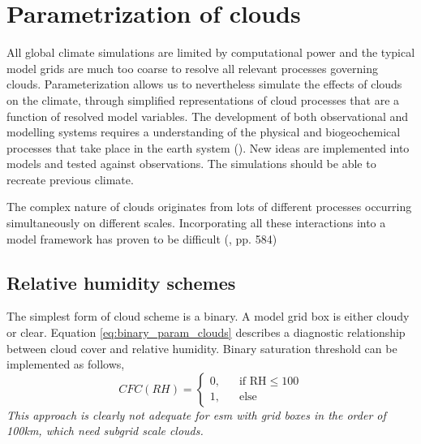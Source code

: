 \section{Parametrization of clouds} \label{sec:param_clouds}
All global climate simulations are limited by computational power and the typical model grids are much too coarse to resolve all relevant processes governing clouds. Parameterization allows us to nevertheless simulate the effects of clouds on the climate, through simplified representations of cloud processes that are a function of resolved model variables. The development of both observational and modelling systems requires a understanding of the physical and biogeochemical processes that take place in the earth system (\cite{Simmons2016Observation2016-2025}). New ideas are implemented into models and tested against observations. The simulations should be able to recreate previous climate. 

The complex nature of clouds originates from lots of different processes occurring simultaneously on different scales. Incorporating all these interactions into a model framework has proven to be difficult (\cite{IPCC_CH7_clouds}, pp. 584)
 

\subsection{Relative humidity schemes}
The simplest form of cloud scheme is a binary. A model grid box is either cloudy or clear. Equation \eqref{eq:binary_param_clouds} describes a diagnostic relationship between cloud cover and relative humidity. Binary saturation threshold can be implemented as follows,
\begin{equation} \label{eq:binary_param_clouds}
    CFC\left(RH\right) = 
     \begin{cases}
       \text{0,} &\quad\text{if RH}\le100\\
       \text{1,} &\quad\text{else}
     \end{cases}
\end{equation}
\textit{This approach is clearly not adequate for \acrshort{esm} with grid boxes in the order of 100km, which need subgrid scale clouds.} \cite{Tomkins2005}

